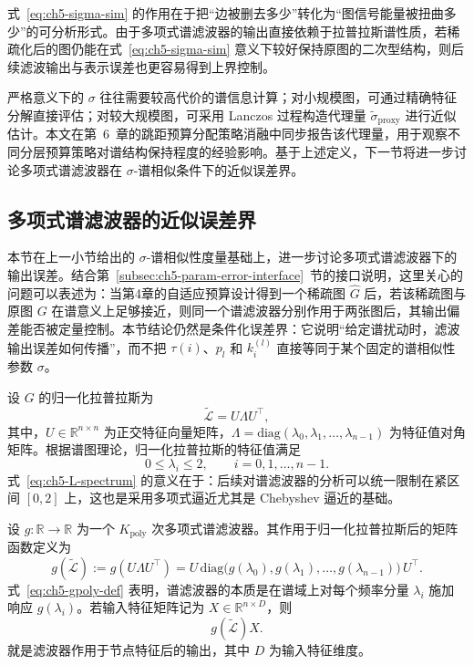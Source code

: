 式~\eqref{eq:ch5-sigma-sim} 的作用在于把“边被删去多少”转化为“图信号能量被扭曲多少”的可分析形式。由于多项式谱滤波器的输出直接依赖于拉普拉斯谱性质，若稀疏化后的图仍能在式~\eqref{eq:ch5-sigma-sim} 意义下较好保持原图的二次型结构，则后续滤波输出与表示误差也更容易得到上界控制\cite{Spielman2011SpectralSparsification,Batson2013SpectralSparsificationSurvey}。

严格意义下的 $\sigma$ 往往需要较高代价的谱信息计算；对小规模图，可通过精确特征分解直接评估；对较大规模图，可采用 Lanczos 过程构造代理量 $\widetilde{\sigma}_{\mathrm{proxy}}$ 进行近似估计。本文在第~6~章的跳距预算分配策略消融中同步报告该代理量，用于观察不同分层预算策略对谱结构保持程度的经验影响。基于上述定义，下一节将进一步讨论多项式谱滤波器在 $\sigma$-谱相似条件下的近似误差界。
\label{idx:theme:specpreserve}
\subsection{多项式谱滤波器的近似误差界}
\label{subsec:ch5-polyfilter}

本节在上一小节给出的 $\sigma$-谱相似性度量基础上，进一步讨论多项式谱滤波器下的输出误差。结合第~\ref{subsec:ch5-param-error-interface}~节的接口说明，这里关心的问题可以表述为：当第4章的自适应预算设计得到一个稀疏图 $\hat{G}$ 后，若该稀疏图与原图 $G$ 在谱意义上足够接近，则同一个谱滤波器分别作用于两张图后，其输出偏差能否被定量控制。本节结论仍然是条件化误差界：它说明“给定谱扰动时，滤波输出误差如何传播”，而不把 $\tau(i)$、$p_l$ 和 $k_i^{(l)}$ 直接等同于某个固定的谱相似性参数 $\sigma$。

设 $G$ 的归一化拉普拉斯为
\begin{equation}
  \tilde{\mathcal{L}} = U\Lambda U^\top,
  \label{eq:ch5-L-eig}
\end{equation}
其中，$U\in\mathbb{R}^{n\times n}$ 为正交特征向量矩阵，$\Lambda=\mathrm{diag}(\lambda_0,\lambda_1,\ldots,\lambda_{n-1})$ 为特征值对角矩阵。根据谱图理论，归一化拉普拉斯的特征值满足
\begin{equation}
  0 \le \lambda_i \le 2,\qquad i=0,1,\ldots,n-1.
  \label{eq:ch5-L-spectrum}
\end{equation}
式~\eqref{eq:ch5-L-spectrum} 的意义在于：后续对谱滤波器的分析可以统一限制在紧区间 $[0,2]$ 上，这也是采用多项式逼近尤其是 Chebyshev 逼近的基础\cite{Chung1997,Hammond2011Wavelets,Shuman2013GSP}。

设 $g:\mathbb{R}\to\mathbb{R}$ 为一个 $K_{\text{poly}}$ 次多项式谱滤波器。其作用于归一化拉普拉斯后的矩阵函数定义为
\begin{equation}
  g(\tilde{\mathcal{L}})
  :=
  g(U\Lambda U^\top)
  =
  U\,\mathrm{diag}\!\bigl(g(\lambda_0),g(\lambda_1),\ldots,g(\lambda_{n-1})\bigr)\,U^\top.
  \label{eq:ch5-gpoly-def}
\end{equation}
式~\eqref{eq:ch5-gpoly-def} 表明，谱滤波器的本质是在谱域上对每个频率分量 $\lambda_i$ 施加响应 $g(\lambda_i)$。若输入特征矩阵记为 $X\in\mathbb{R}^{n\times D}$，则
\begin{equation}
  g(\tilde{\mathcal{L}})X.
  \label{eq:ch5-gpoly-output}
\end{equation}
就是滤波器作用于节点特征后的输出，其中 $D$ 为输入特征维度。

